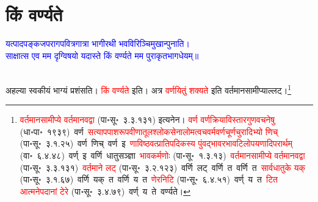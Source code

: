 \section[किं वर्ण्यते]{किं वर्ण्यते}
\centering\textcolor{blue}{यत्पादपङ्कजपरागपवित्रगात्रा भागीरथी भवविरिञ्चिमुखान्पुनाति।\nopagebreak\\
साक्षात्स एव मम दृग्विषयो यदास्ते किं वर्ण्यते मम पुराकृतभागधेयम्॥}\nopagebreak\\
\\
\fontsize{14}{21}\selectfont\begin{sloppypar}\justifying\noindent\hspace{10mm} अहल्या स्वकीयं भाग्यं प्रशंसति। \textcolor{red}{किं वर्ण्यते} इति।
अत्र \textcolor{red}{वर्णयितुं शक्यते} इति वर्तमान\-सामीप्याल्लट्।\footnote{\textcolor{red}{वर्तमान\-सामीप्ये वर्तमानवद्वा} (पा॰सू॰~३.३.१३१) इत्यनेन। \textcolor{red}{वर्ण वर्णक्रिया\-विस्तार\-गुण\-वचनेषु} (धा॰पा॰~१९३९)~\arrow वर्ण~\arrow \textcolor{red}{सत्याप\-पाश\-रूप\-वीणा\-तूल\-श्लोक\-सेना\-लोम\-त्वच\-वर्म\-वर्ण\-चूर्ण\-चुरादिभ्यो णिच्} (पा॰सू॰~३.१.२५)~\arrow वर्ण~णिच्~\arrow वर्ण~इ~\arrow \textcolor{red}{णाविष्ठवत्प्राति\-पदिकस्य पुंवद्भाव\-रभाव\-टिलोप\-यणादि\-परार्थम्} (वा॰~६.४.४८)~\arrow वर्ण्~इ~\arrow वर्णि~\arrow धातु\-सञ्ज्ञा~\arrow \textcolor{red}{भावकर्मणोः} (पा॰सू॰~१.३.१३)~\arrow \textcolor{red}{वर्तमान\-सामीप्ये वर्तमानवद्वा} (पा॰सू॰~३.३.१३१)~\arrow \textcolor{red}{वर्तमाने लट्} (पा॰सू॰~३.२.१२३)~\arrow वर्णि~लट्~\arrow वर्णि~त~\arrow वर्णि~त~\arrow \textcolor{red}{सार्वधातुके यक्} (पा॰सू॰~३.१.६७)~\arrow वर्णि~यक्~त~\arrow वर्णि~य~त~\arrow \textcolor{red}{णेरनिटि} (पा॰सू॰~६.४.५१)~\arrow वर्ण्~य~त~\arrow \textcolor{red}{टित आत्मनेपदानां टेरे} (पा॰सू॰~३.४.७९)~\arrow वर्ण्~य~ते~\arrow वर्ण्यते।}\end{sloppypar}
